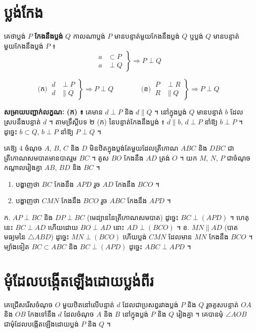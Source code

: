 \section{ប្លង់កែង}
\begin{definition}[និយមន័យ]
គេថាប្លង់ $P$ \textbf{កែងនឹងប្លង់} $Q$ កាលណាប្លង់ $P$ មានបន្ទាត់មួយកែងនឹងប្លង់ $Q$ ឬប្លង់ $Q$ មានបន្ទាត់មួយកែងនឹងប្លង់ $P$ ៖
\[
\left.\begin{aligned} a &\subset P\\ a &\perp Q \end{aligned}\right\} \Rightarrow P \perp Q
\]
\end{definition}
\begin{theorem}[លក្ខណៈ]
\[
\text{(ក)}\ \left.\begin{aligned} d &\perp P\\ d &\parallel Q \end{aligned}\right\} \Rightarrow P \perp Q
\qquad\qquad
\text{(ខ)}\ \left.\begin{aligned} P &\perp R\\ R &\parallel Q \end{aligned}\right\} \Rightarrow P \perp Q
\]
\end{theorem}
\textbf{សម្រាយបញ្ជាក់លក្ខណៈ (ក) ៖} គេមាន $d \perp P$ និង $d \parallel Q$ ។ នៅក្នុងប្លង់ $Q$ មានបន្ទាត់ $b$ ដែលស្របនឹងបន្ទាត់ $d$ ។ តាមទ្រឹស្ដីបទ ២ (ក) នៃបន្ទាត់កែងនឹងប្លង់ ៖ $d \parallel b$, $d \perp P$ នាំឱ្យ $b \perp P$ ។ ដូច្នេះ $b \subset Q$, $b \perp P$ នាំឱ្យ $P \perp Q$ ។

\begin{pro}
គេឱ្យ $4$ ចំណុច $A$, $B$, $C$ និង $D$ មិនឋិតក្នុងប្លង់តែមួយដែលត្រីកោណ $ABC$ និង $DBC$ ជាត្រីកោណសមបាតមានបាតរួម $BC$ ។ គូស $BO$ កែងនឹង $AD$ ត្រង់ $O$ ។ យក $M$, $N$, $P$ ជាចំណុចកណ្ដាលរៀងគ្នា $AB$, $BD$ និង $BC$ ។
\begin{enumerate}[a]
  \item បង្ហាញថា $BC$ កែងនឹង $APD$ រួច $AD$ កែងនឹង $BCO$ ។
  \item បង្ហាញថា $CMN$ កែងនឹង $BCO$ រួច $ABC$ កែងនឹង $APD$ ។
\end{enumerate}
\ans
ក. $AP \perp BC$ និង $DP \perp BC$ (មេដ្យាននៃត្រីកោណសមបាត) ដូច្នេះ $BC \perp (APD)$ ។ ហេតុនេះ $BC \perp AD$ ហើយដោយ $BO \perp AD$ នោះ $AD \perp (BCO)$ ។ \quad ខ. $MN \parallel AD$ (បាតមធ្យមនៃ $\triangle ABD$) ដូច្នេះ $MN \perp (BCO)$ ហើយប្លង់ $CMN$ ដែលមាន $MN$ កែងនឹង $BCO$ ។ ម្យ៉ាងទៀត $BC \subset ABC$ និង $BC \perp (APD)$ ដូច្នេះ $ABC \perp APD$ ។
\end{pro}

\section{មុំដែលបង្កើតឡើងដោយប្លង់ពីរ}
គេជ្រើសរើសចំណុច $O$ មួយឋិតនៅលើបន្ទាត់ $d$ ដែលជាប្រសព្វរវាងប្លង់ $P$ និង $Q$ រួចគូសបន្ទាត់ $OA$ និង $OB$ កែងទៅនឹង $d$ ដែលចំណុច $A$ និង $B$ នៅក្នុងប្លង់ $P$ និង $Q$ រៀងគ្នា ។ គេបានមុំ $\angle AOB$ ជាមុំដែលបង្កើតឡើងដោយប្លង់ $P$ និង $Q$ ។

